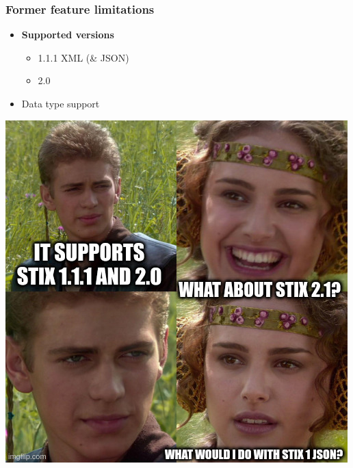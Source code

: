 \begin{frame}
    \frametitle{Former feature limitations}
    \begin{minipage}{0.45\textwidth}
        \begin{itemize}
            \item {\bf Supported versions}
            \begin{itemize}
                \item 1.1.1 XML (\& JSON)
                \item 2.0
            \end{itemize}
            \item Data type support
        \end{itemize}
    \end{minipage}%
    \begin{minipage}{0.55\textwidth}
        \centering
        \includegraphics[width=\textwidth]{images/limited_version.jpg}
    \end{minipage}
\end{frame}

